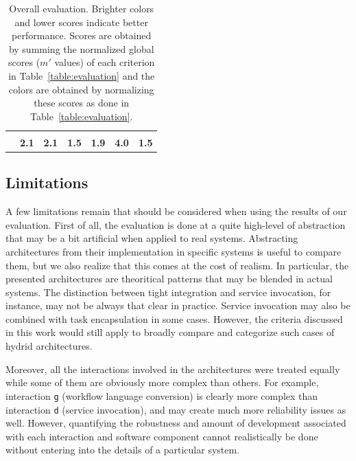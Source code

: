 \documentclass[preprint,3p,twocolumn]{elsarticle}
\begin{document}
\begin{table}
\begin{tabular}{rcccccc}
                                     & \cellcolor[HTML]{99CC99}{0.50}
                                     & \cellcolor[HTML]{99CC99}{0.50}
                                     & \cellcolor[HTML]{99DD99}{0.00}\\
                                    & \cellcolor[HTML]{99E699}\textbf{2.1}
                                    & \cellcolor[HTML]{99E699}\textbf{2.1}
                                    & \cellcolor[HTML]{99FE99}\textbf{1.5}
                                    & \cellcolor[HTML]{99EE99}\textbf{1.9}
                                    & \cellcolor[HTML]{999999}\textbf{4.0}
                                    & \cellcolor[HTML]{99FF99}\textbf{1.5}\\
\end{tabular}
\caption{Overall evaluation. Brighter colors and lower scores indicate better performance. Scores
  are obtained by summing the normalized global scores ($m'$ values) of
  each criterion in Table~\ref{table:evaluation} and the colors are obtained by normalizing these scores
  as done in Table~\ref{table:evaluation}. }
\label{table:overall}
\end{table}

\subsection{Limitations}

A few limitations remain that should be considered when using the
results of our evaluation. First of all, the evaluation is done at a
quite high-level of abstraction that may be a bit artificial when
applied to real systems. Abstracting architectures from their
implementation in specific systems is useful to compare them, but we
also realize that this comes at the cost of realism. In particular,
the presented architectures are theoritical patterns that may be blended in
actual systems. The distinction between tight integration and service
invocation, for instance, may not be always that clear in practice. Service
invocation may also be combined with task encapsulation in some cases. However, the
criteria discussed in this work would still apply to broadly compare and categorize
such cases of hydrid architectures.

Moreover, all the interactions involved in the architectures were
treated equally while some of them are obviously more complex
than others. For example, interaction \texttt{g} (workflow language
conversion) is clearly more complex than interaction \texttt{d}
(service invocation), and may create much more reliability issues as
well. However, quantifying the robustness and amount of development
associated with each interaction and software component cannot
realistically be done without entering into the details of a
particular system.
\end{document}
